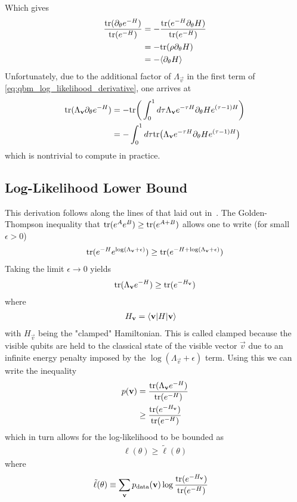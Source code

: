 Which gives
\begin{align}
    \frac{\text{tr}(\partial_\theta e^{-H})}{\text{tr}(e^{-H})}
        &= -\frac{\text{tr}(e^{-H} \partial_\theta H)}{\text{tr}(e^{-H})} \\
        &= -\text{tr}(\rho \partial_\theta H) \\
        &= -\langle \partial_\theta H \rangle
\end{align}
Unfortunately, due to the additional factor of \( \Lambda_\vec{v} \) in the first term of \cref{eq:qbm_log_likelihood_derivative}, one arrives at
\begin{align}
    \text{tr}(\Lambda_{\mathbf{v}} \partial_\theta e^{-H})
        &= -\text{tr}\bigg( \int_{0}^{1} d\tau \Lambda_{\mathbf{v}} e^{-\tau H} \partial_\theta H e^{(\tau-1)H} \bigg) \\
        &= -\int_{0}^{1} d\tau \text{tr}\big(\Lambda_{\mathbf{v}} e^{-\tau H} \partial_\theta H e^{(\tau-1)H} \big)
\end{align}
which is nontrivial to compute in practice.

\subsection{Log-Likelihood Lower Bound}\label{app:qbm_log_likelihood_lower_bound}
This derivation follows along the lines of that laid out in~\cite{amin_2018}.
The Golden-Thompson inequality that \( \text{tr}(e^{A}e^{B}) \ge \text{tr}(e^{A+B}) \) allows one to write (for small \( \epsilon > 0 \))
\begin{align}
    \text{tr}(e^{-H} e^{\log(\Lambda_{\mathbf{v}}+\epsilon)}) \ge \text{tr}(e^{-H+\log(\Lambda_{\mathbf{v}}+\epsilon)})
\end{align}
Taking the limit \( \epsilon \rightarrow 0 \) yields
\begin{align}
    \text{tr}(\Lambda_{\mathbf{v}}e^{-H}) \ge \text{tr}(e^{-H_{\mathbf{v}}})
\end{align}
where
\begin{align}
    H_{\mathbf{v}} &= \braket{\mathbf{v} | H | \mathbf{v}}
\end{align}
with \( H_\vec{v} \) being the "clamped" Hamiltonian.
This is called clamped because the visible qubits are held to the classical state of the visible vector \( \vec{v} \) due to an infinite energy penalty imposed by the \( \log(\Lambda_\vec{v} + \epsilon) \) term.
Using this we can write the inequality
\begin{align}
    p(\mathbf{v})
        &= \frac{\text{tr}(\Lambda_{\mathbf{v}} e^{-H})}{\text{tr}(e^{-H})} \\
        &\ge \frac{\text{tr}(e^{-H_{\mathbf{v}}})}{\text{tr}(e^{-H})}
\end{align}
which in turn allows for the log-likelihood to be bounded as
\begin{align}
    \ell(\theta) \ge \tilde{\ell}(\theta)
\end{align}
where
\begin{align}
    \tilde{\ell}(\theta)
        &\equiv \sum_{\mathbf{v}} p_\text{data}(\mathbf{v}) \log\frac{\text{tr}(e^{-H_{\mathbf{v}}})}{\text{tr}(e^{-H})}
\end{align}
